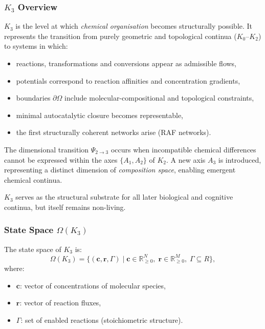 

\subsubsection{\texorpdfstring{$K_3$}{K_3} Overview}
\label{sec:k3-overview}

$K_3$ is the level at which \emph{chemical organisation} becomes
structurally possible. It represents the transition from purely geometric
and topological continua ($K_0$--$K_2$) to systems in which:
\begin{itemize}
    \item reactions, transformations and conversions appear as admissible
          flows,
    \item potentials correspond to reaction affinities and concentration
          gradients,
    \item boundaries $\partial\Omega$ include molecular-compositional and
          topological constraints,
    \item minimal autocatalytic closure becomes representable,
    \item the first structurally coherent networks arise (RAF networks).
\end{itemize}

The dimensional transition $\Psi_{2\to3}$ occurs when incompatible
chemical differences cannot be expressed within the axes $\{A_1,A_2\}$ of
$K_2$. A new axis $A_3$ is introduced, representing a distinct dimension
of \emph{composition space}, enabling emergent chemical continua.

$K_3$ serves as the structural substrate for all later biological and
cognitive continua, but itself remains non-living.

\subsubsection{State Space \texorpdfstring{$\Omega(K_3)$}{\Omega(K_3)}}

The state space of $K_3$ is:
\[
\Omega(K_3) = \{ (\mathbf{c}, \mathbf{r}, \Gamma) \mid 
\mathbf{c} \in \mathbb{R}_{\ge0}^N,\;
\mathbf{r} \in \mathbb{R}_{\ge0}^M,\;
\Gamma \subseteq R \},
\]
where:
\begin{itemize}
    \item $\mathbf{c}$: vector of concentrations of molecular species,
    \item $\mathbf{r}$: vector of reaction fluxes,
    \item $\Gamma$: set of enabled reactions (stoichiometric structure).
\end{itemize}

